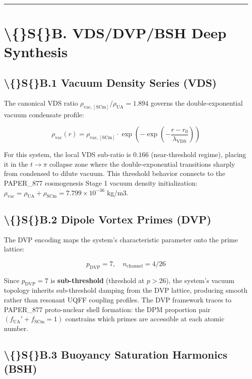 \documentclass[11pt]{article}
\begin{document}
\noindent\rule{\textwidth}{0.4pt}

\section*{\textbackslash\{\}S\{\}B. VDS/DVP/BSH Deep Synthesis}

\subsection*{\textbackslash\{\}S\{\}B.1 Vacuum Density Series (VDS)}

The canonical VDS ratio $\rho_{\mathrm{vac,[SCm]}} / \rho_{\mathrm{UA}} = 1.894$ governs the double-exponential vacuum condensate profile:

$$\rho_{\mathrm{vac}}(r) = \rho_{\mathrm{vac,[SCm]}} \cdot \exp\!\left(-\exp\!\left(-\frac{r - r_0}{\lambda_{\mathrm{VDS}}}\right)\right)$$

For this system, the local VDS sub-ratio is $0.166$ (near-threshold regime), placing it in the $t \to \pi$ collapse zone where the double-exponential transitions sharply from condensed to dilute vacuum. This threshold behavior connects to the PAPER\_877 cosmogenesis Stage 1 vacuum density initialization: $\rho_{\mathrm{vac}} = \rho_{\mathrm{UA}} + \rho_{\mathrm{SCm}} = 7.799 \times 10^{-36}$ kg/m3.

\subsection*{\textbackslash\{\}S\{\}B.2 Dipole Vortex Primes (DVP)}

The DVP encoding maps the system's characteristic parameter onto the prime lattice:

$$p_{\mathrm{DVP}} = 7, \quad n_{\mathrm{channel}} = 4/26$$

Since $p_{\mathrm{DVP}} = 7$ is \textbf{sub-threshold} (threshold at $p > 26$), the system's vacuum topology inherits sub-threshold damping from the DVP lattice, producing smooth rather than resonant UQFF coupling profiles. The DVP framework traces to PAPER\_877 proto-nuclear shell formation: the DPM proportion pair $(f_{\mathrm{UA}}' + f_{\mathrm{SCm}} = 1)$ constrains which primes are accessible at each atomic number.

\subsection*{\textbackslash\{\}S\{\}B.3 Buoyancy Saturation Harmonics (BSH)}
\end{document}
